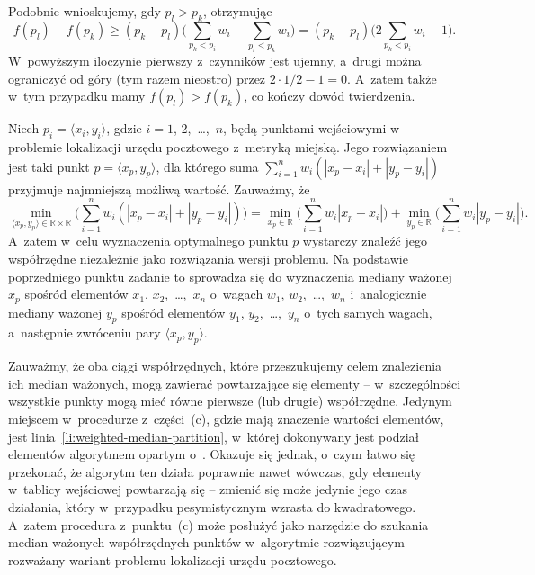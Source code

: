 Podobnie wnioskujemy, gdy $p_l>p_k$, otrzymując
\[
    f(p_l)-f(p_k) \ge (p_k-p_l)\biggl(\sum_{p_k<p_i}w_i-\sum_{p_i\le p_k}w_i\biggr) = (p_k-p_l)\biggl(2\sum_{p_k<p_i}w_i-1\biggr).
\]
W~powyższym iloczynie pierwszy z~czynników jest ujemny, a~drugi można ograniczyć od góry (tym razem nieostro) przez $2\cdot1/2-1=0$.
A~zatem także w~tym przypadku mamy $f(p_l)>f(p_k)$, co kończy dowód twierdzenia.

\subproblem %
Niech $p_i=\langle x_i,y_i\rangle$, gdzie $i=1$, 2,~\dots,~$n$, będą punktami wejściowymi w~ problemie lokalizacji urzędu pocztowego z~metryką miejską.
Jego rozwiązaniem jest taki punkt $p=\langle x_p,y_p\rangle$, dla którego suma $\sum_{i=1}^nw_i(|x_p-x_i|+|y_p-y_i|)$ przyjmuje najmniejszą możliwą wartość.
Zauważmy, że
\[
    \min_{\langle x_p,y_p\rangle\in\mathbb{R}\times\mathbb{R}}\biggl(\sum_{i=1}^nw_i(|x_p-x_i|+|y_p-y_i|)\biggr) = \min_{x_p\in\mathbb{R}}\biggl(\sum_{i=1}^nw_i|x_p-x_i|\biggr)+\min_{y_p\in\mathbb{R}}\biggl(\sum_{i=1}^nw_i|y_p-y_i|\biggr).
\]
A~zatem w~celu wyznaczenia optymalnego punktu $p$ wystarczy znaleźć jego współrzędne niezależnie jako rozwiązania  wersji problemu.
Na podstawie poprzedniego punktu zadanie to sprowadza się do wyznaczenia mediany ważonej $x_p$ spośród elementów $x_1$, $x_2$,~\dots,~$x_n$ o~wagach $w_1$, $w_2$,~\dots,~$w_n$ i~analogicznie mediany ważonej $y_p$ spośród elementów $y_1$, $y_2$,~\dots,~$y_n$ o~tych samych wagach, a~następnie zwróceniu pary $\langle x_p,y_p\rangle$.

Zauważmy, że oba ciągi współrzędnych, które przeszukujemy celem znalezienia ich median ważonych, mogą zawierać powtarzające się elementy -- w~szczególności wszystkie punkty mogą mieć równe pierwsze (lub drugie) współrzędne.
Jedynym miejscem w~procedurze  z~części~(c), gdzie mają znaczenie wartości elementów, jest linia~\ref{li:weighted-median-partition}, w~której dokonywany jest podział elementów algorytmem opartym o~.
Okazuje się jednak, o~czym łatwo się przekonać, że algorytm ten działa poprawnie nawet wówczas, gdy elementy w~tablicy wejściowej powtarzają się -- zmienić się może jedynie jego czas działania, który w~przypadku pesymistycznym wzrasta do kwadratowego.
A~zatem procedura z~punktu~(c) może posłużyć jako narzędzie do szukania median ważonych współrzędnych punktów w~algorytmie rozwiązującym rozważany wariant problemu lokalizacji urzędu pocztowego.


